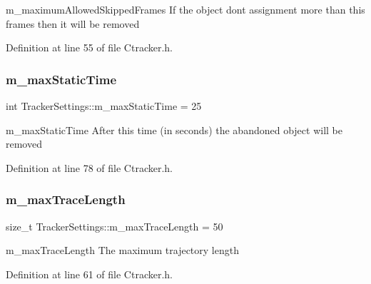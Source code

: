 m\+\_\+maximum\+Allowed\+Skipped\+Frames If the object don\textquotesingle{}t assignment more than this frames then it will be removed 



Definition at line 55 of file Ctracker.\+h.

\mbox{\label{struct_tracker_settings_a810f1687289a964756cd700a22d219d2}} 
\subsubsection{\texorpdfstring{m\+\_\+max\+Static\+Time}{m\_maxStaticTime}}
{\footnotesize\ttfamily int Tracker\+Settings\+::m\+\_\+max\+Static\+Time = 25}



m\+\_\+max\+Static\+Time After this time (in seconds) the abandoned object will be removed 



Definition at line 78 of file Ctracker.\+h.

\mbox{\label{struct_tracker_settings_abc7ce62dfe8de5ae33506aac41fddcac}} 
\subsubsection{\texorpdfstring{m\+\_\+max\+Trace\+Length}{m\_maxTraceLength}}
{\footnotesize\ttfamily size\+\_\+t Tracker\+Settings\+::m\+\_\+max\+Trace\+Length = 50}



m\+\_\+max\+Trace\+Length The maximum trajectory length 



Definition at line 61 of file Ctracker.\+h.

\mbox{\label{struct_tracker_settings_aee7628ff95fa54ad4422e01d45690a6d}} 
